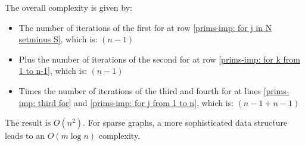 The overall complexity is given by:
\begin{itemize}
    \item The number of iterations of the first for at row \ref{prims-imp: for j in N setminus S}, which is: $\left(n-1\right)$

    \item Plus the number of iterations of the second for at row \ref{prims-imp: for k from 1 to n-1}, which is: $\left(n-1\right)$
    
    \item Times the number of iterations of the third and fourth for at lines \ref{prims-imp: third for} and \ref{prims-imp: for j from 1 to n}, which is: $\left(n-1+n-1\right)$
\end{itemize}
The result is $O\left(n^{2}\right)$. For sparse graphs, a more sophisticated data structure leads to an $O\left(m \log n\right)$ complexity.